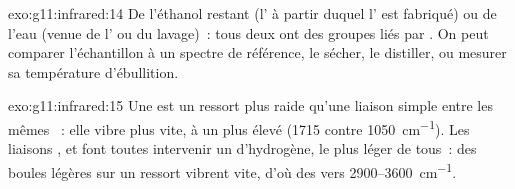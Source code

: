 \begin{solution}{exo:g11:infrared:14}
De l'éthanol restant (l' à partir duquel l' est fabriqué) ou
de l'eau (venue de l' ou du lavage)~: tous deux ont des groupes
 liés par . On peut comparer l'échantillon à un
spectre de référence, le sécher, le distiller, ou mesurer sa température
d'ébullition.
\end{solution}

\begin{solution}{exo:g11:infrared:15}
Une  est un ressort plus raide qu'une liaison simple entre
les mêmes ~: elle vibre plus vite, à un  plus élevé
(1715 contre \qty{1050}{cm^{-1}}). Les liaisons ,  et
 font toutes intervenir un  d'hydrogène, le plus léger de
tous~: des boules légères sur un ressort vibrent vite, d'où des  vers 2900--\qty{3600}{cm^{-1}}.
\end{solution}

